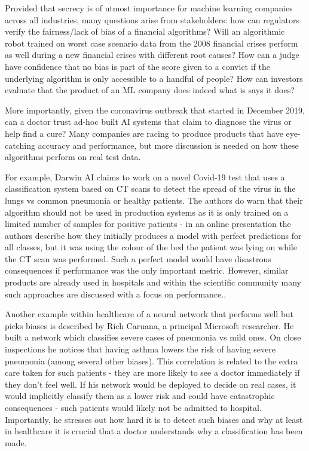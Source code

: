 \documentclass[proposal]{softeng}
\begin{document}
Provided that secrecy is of utmost importance for machine learning companies across all industries, many questions arise from stakeholders: how can regulators verify the fairness/lack of bias of a financial algorithms? Will an algorithmic robot trained on worst case scenario data from the 2008 financial crises perform as well during a new financial crises with different root causes? How can a judge have confidence that no bias is part of the score given to a convict if the underlying algorithm is only accessible to a handful of people? How can investors evaluate that the product of an ML company does indeed what is says it does? 

More importantly, given the coronavirus outbreak that started in December 2019, can a doctor trust ad-hoc built AI systems that claim to diagnose the virus or help find a cure? Many companies are racing to produce products that have eye-catching accuracy and performance, but more discussion is needed on how these algorithms perform on real test data. 

For example, Darwin AI \cite{DarwinAI} claims to work on a novel Covid-19 test that uses a classification system based on CT scans to detect the spread of the virus in the lungs vs common pneumonia or healthy patients\cite{covid-net}. The authors do warn that their algorithm should not be used in production systems as it is only trained on a limited number of samples for positive patients - in an online presentation the authors describe how they initially produces a model with perfect predictions for all classes, but it was using the colour of the bed the patient was lying on while the CT scan was performed. Such a perfect model would have disastrous consequences if performance was the only important metric. However, similar products are already used in hospitals\cite{aids-doctors} and within the scientific community many such approaches are discussed with a focus on performance.\cite{ai-covid-19}.

Another example within healthcare of a neural network that performs well but picks biases is described by Rich Caruana, a principal Microsoft researcher. He built a network which classifies severe cases of pneumonia vs mild ones\cite{rich-caruana}. On close inspections he notices that having asthma lowers the risk of having severe pneumonia (among several other biases). This correlation is related to the extra care taken for such patients - they are more likely to see a doctor immediately if they don't feel well. If his network would be deployed to decide on real cases, it would implicitly classify them as a lower risk and could have catastrophic consequences - such patients would likely not be admitted to hospital. Importantly, he stresses out how hard it is to detect such biases and why at least in healthcare it is crucial that a doctor understands why a classification has been made. 
\end{document}

